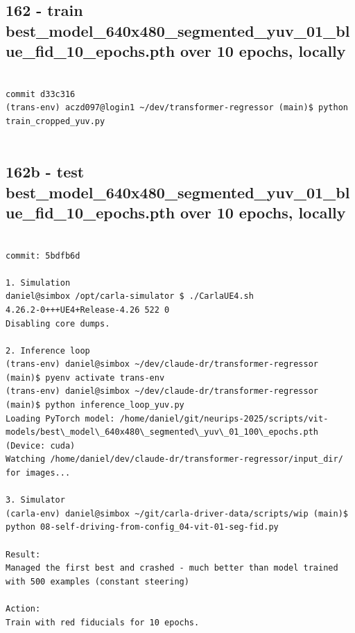 \subsection{162 - train best\_model\_640x480\_segmented\_yuv\_01\_blue\_fid\_10\_epochs.pth over 10 epochs, locally}
\label{app_res:162}

\begin{verbatim}

commit d33c316
(trans-env) aczd097@login1 ~/dev/transformer-regressor (main)$ python train_cropped_yuv.py


\end{verbatim}

\subsection{162b - test best\_model\_640x480\_segmented\_yuv\_01\_blue\_fid\_10\_epochs.pth over 10 epochs, locally}
\label{app_res:162b}

\begin{verbatim}

commit: 5bdfb6d

1. Simulation
daniel@simbox /opt/carla-simulator $ ./CarlaUE4.sh 
4.26.2-0+++UE4+Release-4.26 522 0
Disabling core dumps.

2. Inference loop
(trans-env) daniel@simbox ~/dev/claude-dr/transformer-regressor (main)$ pyenv activate trans-env
(trans-env) daniel@simbox ~/dev/claude-dr/transformer-regressor (main)$ python inference_loop_yuv.py 
Loading PyTorch model: /home/daniel/git/neurips-2025/scripts/vit-models/best\_model\_640x480\_segmented\_yuv\_01_100\_epochs.pth (Device: cuda)
Watching /home/daniel/dev/claude-dr/transformer-regressor/input_dir/ for images...

3. Simulator
(carla-env) daniel@simbox ~/git/carla-driver-data/scripts/wip (main)$ python 08-self-driving-from-config_04-vit-01-seg-fid.py 

Result:
Managed the first best and crashed - much better than model trained with 500 examples (constant steering)

Action:
Train with red fiducials for 10 epochs.

\end{verbatim}

